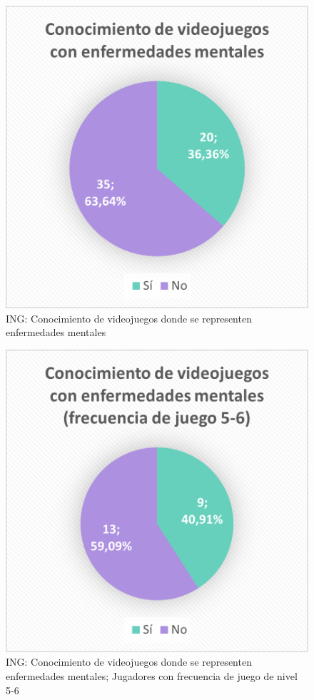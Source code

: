 \documentclass[12pt, a4paper,twoside,titlepage]{book}
\begin{document}
\begin{figure}
    \centering
    \includegraphics[width=.7\linewidth]{ANEXO ING/12AnexINGConvid}
    \caption{ING: Conocimiento de videojuegos donde se representen enfermedades mentales}
    \label{fig:INGConvid}
\end{figure}

\begin{figure}
    \centering
    \includegraphics[width=.7\linewidth]{ANEXO ING/123AnexINGConvid}
    \caption{ING: Conocimiento de videojuegos donde se representen enfermedades mentales; Jugadores con frecuencia de juego de nivel 5-6}
\end{figure}
\end{document}
